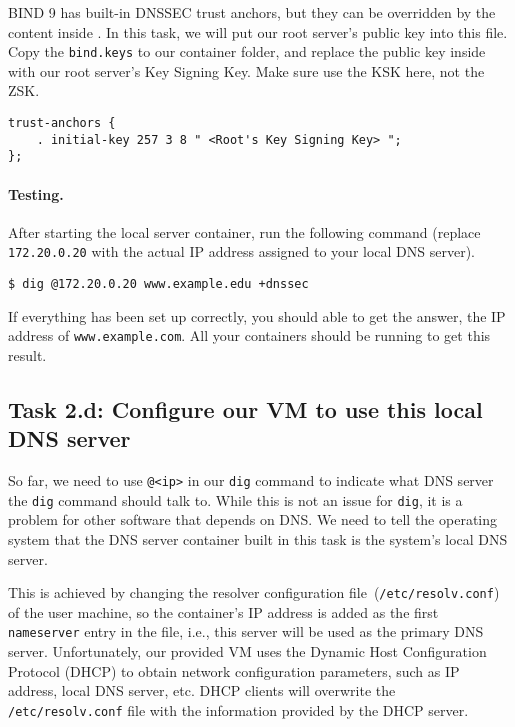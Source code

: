 BIND 9 has built-in DNSSEC trust anchors, but they can be 
overridden by the content inside .  
In this task, we will put our root server's public key 
into this file. Copy the \texttt{bind.keys} to our container folder,
and replace the public key inside with our root server's 
Key Signing Key. Make sure use the KSK here, not the ZSK. 


\begin{lstlisting}
trust-anchors {
    . initial-key 257 3 8 " <Root's Key Signing Key> ";
};
\end{lstlisting}


\paragraph{Testing.} After starting the local server container, run the 
following command (replace \texttt{172.20.0.20} with the actual IP 
address assigned to your local DNS server).

\begin{lstlisting}
$ dig @172.20.0.20 www.example.edu +dnssec
\end{lstlisting}

If everything has been set up correctly, you should able to get the 
answer, the IP address of \texttt{www.example.com}. All your containers
should be running to get this result. 



\subsection{Task 2.d: Configure our VM to use this local DNS server}

So far, we need to use \texttt{@<ip>} in our \texttt{dig} command
to indicate what DNS server the \texttt{dig} command should talk to. While this
is not an issue for \texttt{dig}, it is a problem for other software that
depends on DNS. We need to tell the operating system that the
DNS server container built in this task is the system's
local DNS server.

This is achieved by changing
the resolver configuration file~(\texttt{/etc/resolv.conf}) of the user machine,
so the container's IP address is added as the first \texttt{nameserver} entry in the file, i.e.,
this server will be used as the primary DNS server.
Unfortunately, our provided VM uses the Dynamic Host Configuration Protocol (DHCP) to obtain
network configuration parameters, such as IP address, local DNS server, etc.
DHCP clients will overwrite the \texttt{/etc/resolv.conf} file with the information
provided by the DHCP server.

